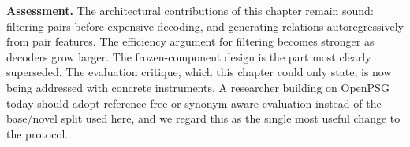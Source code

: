 \noindent \textbf{Assessment.}
The architectural contributions of this chapter remain sound: filtering pairs before expensive decoding, and generating relations autoregressively from pair features. The efficiency argument for filtering becomes stronger as decoders grow larger. The frozen-component design is the part most clearly superseded. The evaluation critique, which this chapter could only state, is now being addressed with concrete instruments. A researcher building on OpenPSG today should adopt reference-free or synonym-aware evaluation instead of the base/novel split used here, and we regard this as the single most useful change to the protocol.

